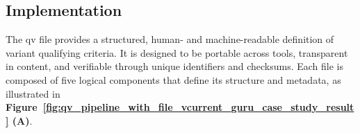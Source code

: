%
%
%


\subsection{Implementation} \label{sec:framework}

The \ac{qv} file provides a structured, human- and machine-readable definition of variant qualifying criteria. 
It is designed to be portable across tools, transparent in content, and verifiable through unique identifiers and checksums.
Each file is composed of five logical components that define its structure and metadata, as illustrated in \textbf{Figure~\ref{fig:qv_pipeline_with_file_vcurrent_guru_case_study_result} (A)}.

